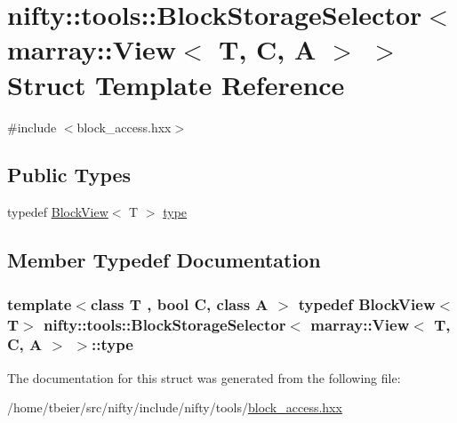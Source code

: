 \hypertarget{structnifty_1_1tools_1_1BlockStorageSelector_3_01marray_1_1View_3_01T_00_01C_00_01A_01_4_01_4}{}\section{nifty\+:\+:tools\+:\+:Block\+Storage\+Selector$<$ marray\+:\+:View$<$ T, C, A $>$ $>$ Struct Template Reference}
\label{structnifty_1_1tools_1_1BlockStorageSelector_3_01marray_1_1View_3_01T_00_01C_00_01A_01_4_01_4}


{\ttfamily \#include $<$block\+\_\+access.\+hxx$>$}

\subsection*{Public Types}
\begin{DoxyCompactItemize}
\item 
typedef \hyperlink{classnifty_1_1tools_1_1BlockView}{Block\+View}$<$ T $>$ \hyperlink{structnifty_1_1tools_1_1BlockStorageSelector_3_01marray_1_1View_3_01T_00_01C_00_01A_01_4_01_4_a23f0abbf6c69d9fd6db3d19d7de5c261}{type}
\end{DoxyCompactItemize}


\subsection{Member Typedef Documentation}
\hypertarget{structnifty_1_1tools_1_1BlockStorageSelector_3_01marray_1_1View_3_01T_00_01C_00_01A_01_4_01_4_a23f0abbf6c69d9fd6db3d19d7de5c261}{}
\subsubsection[{type}]{\setlength{\rightskip}{0pt plus 5cm}template$<$class T , bool C, class A $>$ typedef {\bf Block\+View}$<$T$>$ {\bf nifty\+::tools\+::\+Block\+Storage\+Selector}$<$ marray\+::\+View$<$ T, C, A $>$ $>$\+::{\bf type}}\label{structnifty_1_1tools_1_1BlockStorageSelector_3_01marray_1_1View_3_01T_00_01C_00_01A_01_4_01_4_a23f0abbf6c69d9fd6db3d19d7de5c261}


The documentation for this struct was generated from the following file\+:\begin{DoxyCompactItemize}
\item 
/home/tbeier/src/nifty/include/nifty/tools/\hyperlink{block__access_8hxx}{block\+\_\+access.\+hxx}\end{DoxyCompactItemize}
